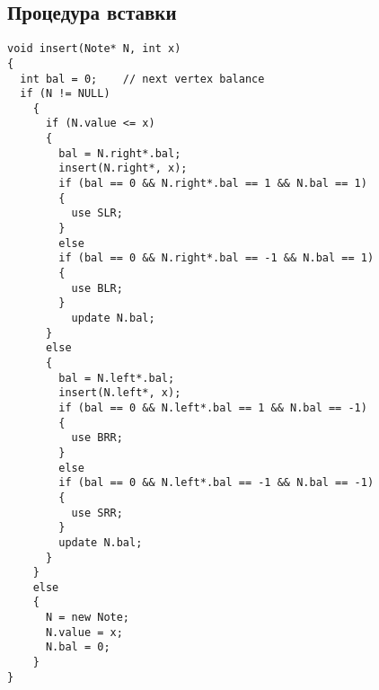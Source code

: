 \documentclass[12pt, a4paper]{report}			%
\begin{document}
\subsection{Процедура вставки}
\lstset{language = C++}
\begin{lstlisting}
void insert(Note* N, int x)
{
  int bal = 0;    // next vertex balance
  if (N != NULL)
    {
      if (N.value <= x)
      {
        bal = N.right*.bal;
        insert(N.right*, x);
        if (bal == 0 && N.right*.bal == 1 && N.bal == 1)
        {
          use SLR;
        }
        else
        if (bal == 0 && N.right*.bal == -1 && N.bal == 1)
        {
          use BLR;
        }
          update N.bal;
      }
      else
      {
        bal = N.left*.bal;
        insert(N.left*, x);
        if (bal == 0 && N.left*.bal == 1 && N.bal == -1)
        {
          use BRR;
        }
        else
        if (bal == 0 && N.left*.bal == -1 && N.bal == -1)
        {
          use SRR;
        }
        update N.bal;
      }
    }
    else
    {
      N = new Note;
      N.value = x;
      N.bal = 0;
    }
}
\end{lstlisting}
\end{document}
